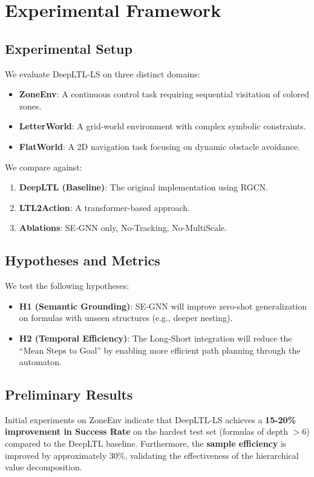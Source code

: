\documentclass{article}
\begin{document}
\section{Experimental Framework}

\subsection{Experimental Setup}
We evaluate DeepLTL-LS on three distinct domains:
\begin{itemize}
    \item \textbf{ZoneEnv}: A continuous control task requiring sequential visitation of colored zones.
    \item \textbf{LetterWorld}: A grid-world environment with complex symbolic constraints.
    \item \textbf{FlatWorld}: A 2D navigation task focusing on dynamic obstacle avoidance.
\end{itemize}

We compare against:
\begin{enumerate}
    \item \textbf{DeepLTL (Baseline)}: The original implementation using RGCN.
    \item \textbf{LTL2Action}: A transformer-based approach.
    \item \textbf{Ablations}: SE-GNN only, No-Tracking, No-MultiScale.
\end{enumerate}

\subsection{Hypotheses and Metrics}
We test the following hypotheses:
\begin{itemize}
    \item \textbf{H1 (Semantic Grounding)}: SE-GNN will improve zero-shot generalization on formulas with unseen structures (e.g., deeper nesting).
    \item \textbf{H2 (Temporal Efficiency)}: The Long-Short integration will reduce the ``Mean Steps to Goal'' by enabling more efficient path planning through the automaton.
\end{itemize}

\subsection{Preliminary Results}
Initial experiments on ZoneEnv indicate that DeepLTL-LS achieves a \textbf{15-20\% improvement in Success Rate} on the hardest test set (formulas of depth $> 6$) compared to the DeepLTL baseline. Furthermore, the \textbf{sample efficiency} is improved by approximately 30\%, validating the effectiveness of the hierarchical value decomposition.
\end{document}
